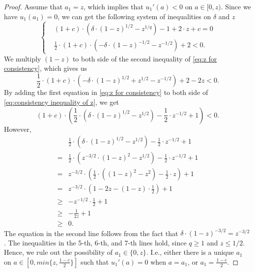 \begin{proof}
Assume that $a_1=z$, which implies that $u_1'(a)<0$ on $a\in[0,z)$. Since we have $u_1(a_1)=0$, we can get the following system of inequalities on $\delta$ and $z$
\begin{equation}
\label{eq:z for consistency}
\left\{
    \begin{aligned}
    &(1+c)\cdot(\delta\cdot(1-z)^{1/2}-{z}^{1/q})-1+2\cdot z+c=0\\
    &\frac{1}{2}\cdot(1+c)\cdot\left(-\delta\cdot(1-z)^{-1/2}-z^{-1/2}\right)+2<0.
    \end{aligned}
    \right.
\end{equation}
We multiply $(1-z)$ to both side of the second inequality of \eqref{eq:z for consistency}, which gives us
\begin{equation}
\label{eq:consistency inequality of z}
    \frac{1}{2}\cdot(1+c)\cdot\left(-\delta\cdot(1-z)^{1/2}+z^{1/2}-z^{-1/2}\right)+2-2z<0.
\end{equation}
By adding the first equation in \eqref{eq:z for consistency} to both side of \eqref{eq:consistency inequality of z}, we get
\begin{equation}
\label{eq:consistency inequality of z(2)}
    (1+c)\cdot\left(\frac{1}{2}\cdot\left(\delta\cdot(1-z)^{1/2}-z^{1/2}\right)-\frac{1}{2}\cdot z^{-1/2}+1\right)<0.
\end{equation}
However,
\begin{align*}
   &\frac{1}{2}\cdot\left(\delta\cdot(1-z)^{1/2}-z^{1/2}\right)-\frac{1}{2}\cdot z^{-1/2}+1\\
   =&\frac{1}{2}\cdot\left(z^{-3/2}\cdot(1-z)^2-z^{1/2}\right)-\frac{1}{2}\cdot z^{-1/2}+1\\
   =&z^{-3/2}\cdot\left(\frac{1}{2}\cdot\left((1-z)^2-z^2\right)-\frac{1}{2}\cdot z\right)+1\\
   =&z^{-3/2}\cdot\left(1-2z-(1-z)\cdot\frac{1}{2}\right)+1\\
   \ge& -z^{-1/2}\cdot\frac{1}{2}+1\\
   \ge& -\frac{1}{2z}+1\\
   \geq& 0.
\end{align*}
The equation in the second line follows from the fact that $\delta\cdot(1-z)^{-3/2}=z^{-3/2}$. The inequalities in the 5-th, 6-th, and 7-th lines hold, since $q\ge 1$ and $z\leq1/2$. Hence, we rule out the possibility of $a_1\in\{0,z\}$. I.e., either there is a unique $a_1$ on $a\in\left[0,min\{z,\frac{1-c}{2}\}\right]$ such that $u_1'(a)=0$ when $a=a_1$, or $a_1=\frac{1-c}{2}$.
\end{proof}

